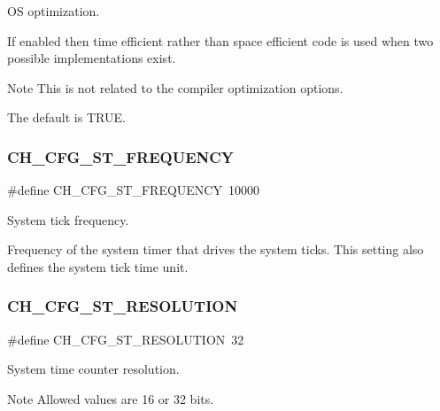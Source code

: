 OS optimization. 

If enabled then time efficient rather than space efficient code is used when two possible implementations exist.

\begin{DoxyNote}{Note}
This is not related to the compiler optimization options. 

The default is {\ttfamily T\+R\+UE}. 
\end{DoxyNote}
\hypertarget{group__config_ga174ac107e620ac81bb1487c1ad7ad839}{}\label{group__config_ga174ac107e620ac81bb1487c1ad7ad839} 
\subsubsection{\texorpdfstring{C\+H\+\_\+\+C\+F\+G\+\_\+\+S\+T\+\_\+\+F\+R\+E\+Q\+U\+E\+N\+CY}{CH\_CFG\_ST\_FREQUENCY}}
{\footnotesize\ttfamily \#define C\+H\+\_\+\+C\+F\+G\+\_\+\+S\+T\+\_\+\+F\+R\+E\+Q\+U\+E\+N\+CY~10000}



System tick frequency. 

Frequency of the system timer that drives the system ticks. This setting also defines the system tick time unit. \hypertarget{group__config_ga2af9a4c66ec41bad799a27c94728c1ae}{}\label{group__config_ga2af9a4c66ec41bad799a27c94728c1ae} 
\subsubsection{\texorpdfstring{C\+H\+\_\+\+C\+F\+G\+\_\+\+S\+T\+\_\+\+R\+E\+S\+O\+L\+U\+T\+I\+ON}{CH\_CFG\_ST\_RESOLUTION}}
{\footnotesize\ttfamily \#define C\+H\+\_\+\+C\+F\+G\+\_\+\+S\+T\+\_\+\+R\+E\+S\+O\+L\+U\+T\+I\+ON~32}



System time counter resolution. 

\begin{DoxyNote}{Note}
Allowed values are 16 or 32 bits. 
\end{DoxyNote}
\hypertarget{group__config_ga11ec0b9fb6a84d32dbc8567cc4af4d17}{}\label{group__config_ga11ec0b9fb6a84d32dbc8567cc4af4d17} 

